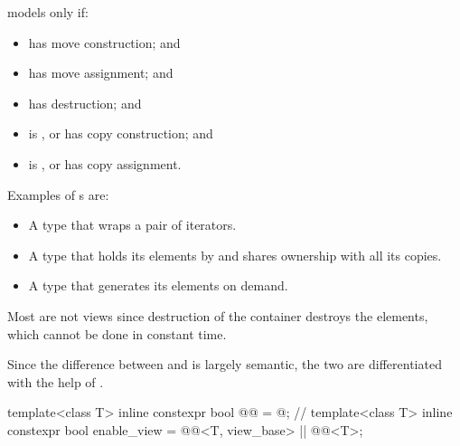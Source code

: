 \begin{itemdescr}
\pnum
{} models  only if:
\begin{itemize}
\item
{} has  move construction; and

\item
{} has  move assignment; and

\item
{} has  destruction; and

\item
{} is , or
 has  copy construction; and

\item
{} is , or
 has  copy assignment.
\end{itemize}

\pnum
\begin{example}
Examples of s are:
\begin{itemize}
\item A  type that wraps a pair of iterators.

\item A  type that holds its elements by 
and shares ownership with all its copies.

\item A  type that generates its elements on demand.
\end{itemize}

Most  are not views since
destruction of the container destroys the elements,
which cannot be done in constant time.
\end{example}
\end{itemdescr}

\pnum
Since the difference between  and  is largely
semantic, the two are differentiated with the help of .

%
\begin{itemdecl}
template<class T>
  inline constexpr bool @@ = @\seebelownc@;     // \expos
template<class T>
  inline constexpr bool enable_view =
    @@<T, view_base> || @@<T>;
\end{itemdecl}

